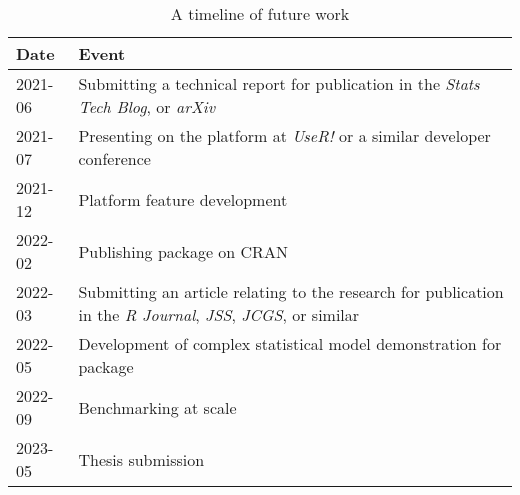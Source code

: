 \begin{table}%
        \centering
        \begin{tabularx}{\textwidth}{lX}
                \toprule
                Date & Event\\
                \midrule
		2021-06 & Submitting a technical report for publication in the \textit{Stats Tech Blog}, or \textit{arXiv}\\
		2021-07 & Presenting on the platform at \textit{UseR!} or a similar developer conference\\
                2021-12 & Platform feature development\\
                2022-02 & Publishing package on CRAN\\
		2022-03 & Submitting an article relating to the research for publication in the \textit{R Journal}, \textit{JSS}, \textit{JCGS}, or similar\\
                2022-05 & Development of complex statistical model demonstration for package\\
                2022-09 & Benchmarking at scale\\
                2023-05 & Thesis submission\\
                \bottomrule
        \end{tabularx}
        \caption{\label{future-timeline}A timeline of future work}
\end{table}
